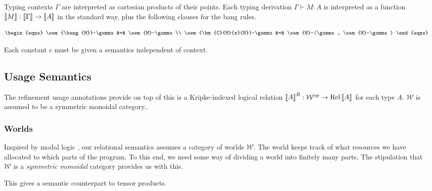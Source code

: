 Typing contexts $\Gamma$ are interpreted as cartesian products of their points.
Each typing derivation $\Gamma \vdash M : A$ is interpreted as a function
$\left\llbracket M \right\rrbracket : \left\llbracket \Gamma \right\rrbracket \to \left\llbracket A \right\rrbracket$ in the standard way, plus the following
clauses for the bang rules.

\begin{displaymath}
  \begin{eqns}
    \sem{\bang{M}}~\gamma &=& \sem{M}~\gamma \\
    \sem{\bm{C}{M}{x}{N}}~\gamma &=& \sem{N}~(\gamma, \sem{M}~\gamma)
  \end{eqns}
\end{displaymath}

Each constant $c$ must be given a semantics independent of
context.

\subsection{Usage Semantics}

The refinement usage annotations provide on top of this is a Kripke-indexed
logical relation $\left\llbracket A \right\rrbracket^R : \mathcal{W}^{op} \to \operatorname{Rel}\left\llbracket A \right\rrbracket$
for each type $A$.
$\mathcal{W}$ is assumed to be a symmetric monoidal category..


\subsubsection{Worlds}

Inspired by modal logic , our relational semantics assumes a category
of worlds $\mathcal W$.
The world keeps track of what resources we have allocated to which parts of the
program.
To this end, we need some way of dividing a world into finitely many parts.
The stipulation that $\mathcal W$ is a \emph{symmetric monoidal}
category provides us with this.

This gives a semantic counterpart to tensor products.


